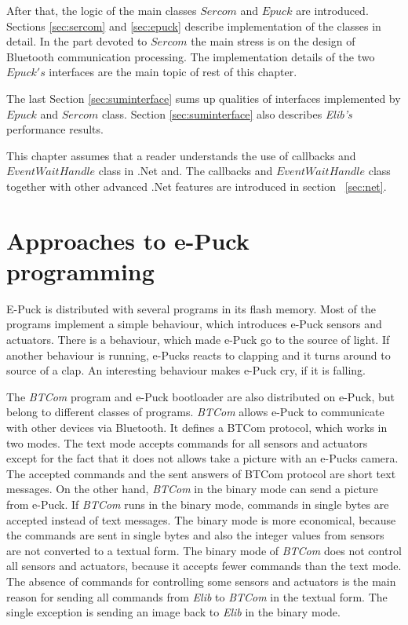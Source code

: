 	After that, the logic of the main classes $Sercom$ and $Epuck$ are introduced. Sections 
	\ref{sec:sercom} and \ref{sec:epuck} describe implementation of the classes in detail. 
	In the part devoted to $Sercom$ the main stress is on the design of Bluetooth communication processing.
	The implementation details of the two $Epuck's$ interfaces are the main topic of rest of this chapter. 

	The last Section \ref{sec:suminterface} sums up qualities of interfaces 
	implemented by $Epuck$ and $Sercom$ class.
	Section \ref{sec:suminterface} also describes {\it Elib's} performance results.

	This chapter assumes that a reader understands the use of callbacks and $EventWaitHandle$ class in .Net and.
	The callbacks and $EventWaitHandle$ class together with other advanced .Net features 
	are introduced in section ~\ref{sec:net}.
  
\section{Approaches to e-Puck programming} \label{sec:approach}
	E-Puck is distributed with several programs in its flash memory. 
	Most of the programs implement a simple behaviour, which introduces e-Puck sensors and actuators.
	There is a behaviour, which made e-Puck go to the source of light.
	If another behaviour is running, e-Pucks
	reacts to clapping and it turns around to source of a clap. An interesting behaviour makes
	e-Puck cry, if it is falling.
	 
	The {\it BTCom} program and e-Puck bootloader are also distributed on e-Puck, but belong to different classes of programs. 
	{\it BTCom} allows e-Puck to communicate with other devices via Bluetooth.
	It defines a BTCom protocol, which works in two modes. The text mode accepts commands for
	all sensors and actuators except for the fact that it does not allows take a picture 
	with an e-Pucks camera. 
	The accepted commands and the sent answers of BTCom protocol are short text messages.
	On the other hand, {\it BTCom} in the binary mode can send a picture from e-Puck.
	If {\it BTCom} runs in the binary mode, commands in single bytes are accepted instead of text messages.
	The binary mode is more economical, 
	because the commands are sent in single bytes and also the integer values from sensors
	are not converted to a textual form.
	The binary mode of {\it BTCom} does not control all sensors and actuators, because it accepts fewer commands than the text mode.
	The absence of commands for controlling some sensors and actuators is the main reason 
	for sending all commands from {\it Elib} to {\it BTCom} in the textual form. 
	The single exception is sending an image back to {\it Elib} in the binary mode.
	 
